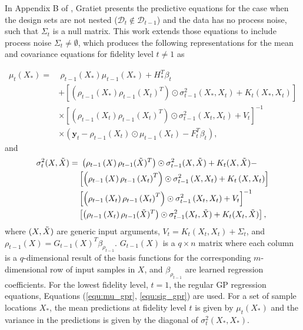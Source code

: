 In Appendix B of \cite{gratiet_multi-fidelity_nodate}, Gratiet presents the predictive equations for the case when the design sets are not nested ($\mathcal{D}_t \notin \mathcal{D}_{t-1}$) and the data has no process noise, such that $\Sigma_t$ is a null matrix. This work extends those equations to include process noise $\Sigma_t \neq \emptyset$, which produces the following representations for the mean and covariance equations for fidelity level $t \neq 1$ as

\begin{equation}\label{equ:mu_Zt}
\begin{split}
    \mu_{t}(X_*) = & ~ \rho_{t-1} \left ( X_* \right ) \mu_{t-1} \left (X_* \right ) + H_*^T\beta_t \\
    & + \left [ \left ( \rho_{t-1} \left (X_* \right ) \rho_{t-1} \left (X_t \right )^T \right ) \odot \sigma^2_{t-1} \left(X_*,X_t \right) + K_{t} \left(X_*,X_t \right)\right] \\ 
    & \times \left [ \left ( \rho_{t-1} \left (X_t \right ) \rho_{t-1} \left (X_t \right )^T \right ) \odot \sigma^2_{t-1} \left(X_t,X_t \right) + V_t \right ]^{-1} \\ 
    & \times \left (\mathbf{y}_t - \rho_{t-1} \left (X_t \right ) \odot \mu_{t-1} \left (X_t \right) - F_t^T \beta_t \right),
\end{split}
\end{equation}
and
\begin{equation}\label{equ:sig_Zt}
\begin{split}
    \sigma^2_{t}(X, \Tilde{X}) = & ~ \left (\rho_{t-1} \left ( X \right ) \rho_{t-1} ( \Tilde{X})^T \right ) \odot \sigma^2_{t-1} (X, \Tilde{X}) + K_t(X, \Tilde{X}) - \\
    & \left [ \left ( \rho_{t-1} \left (X \right ) \rho_{t-1} \left (X_t \right )^T \right ) \odot \sigma^2_{t-1} \left(X,X_t \right) + K_{t} \left(X,X_t \right)\right] \\ 
    & \left [ \left ( \rho_{t-1} \left (X_t \right ) \rho_{t-1} \left (X_t \right )^T \right ) \odot \sigma^2_{t-1} \left(X_t,X_t \right) + V_t \right ]^{-1} \\ 
    & \left [ \left ( \rho_{t-1} \left (X_t \right ) \rho_{t-1} ( \Tilde{X} )^T \right ) \odot \sigma^2_{t-1} (X_t, \Tilde{X} ) + K_{t} ( X_t, \Tilde{X} ) \right], 
\end{split}
\end{equation}
where $(X, \Tilde{X})$ are generic input arguments, $V_t = K_{t} \left(X_t,X_t \right) + \Sigma_t $, and $\rho_{t-1} (X) = G_{t-1}(X)^T \beta_{\rho_{t-1}}$. $G_{t-1}(X)$ is a $q \times n$ matrix where each column is a $q$-dimensional result of the basis functions for the corresponding $m$-dimensional row of input samples in $X$, and $\beta_{\rho_{t-1}}$ are learned regression coefficients. For the lowest fidelity level, $t=1$, the regular GP regression equations, Equations (\ref{equ:mu_gpr}, \ref{equ:sig_gpr}) are used. For a set of sample locations $X_*$, the mean predictions at fidelity level $t$ is given by $\mu_t(X_*)$ and the variance in the predictions is given by the diagonal of $\sigma^2_t(X_*,X_*)$. 

